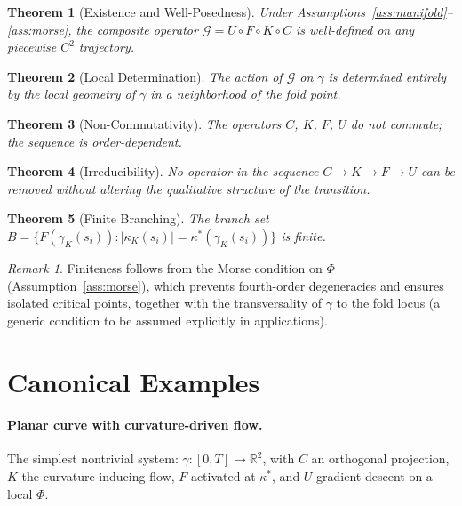 \documentclass[12pt, oneside]{book}
\theoremstyle{plain}
\newtheorem{theorem}{Theorem}[section]
\theoremstyle{definition}
\theoremstyle{remark}
\newtheorem{remark}{Remark}[section]
\begin{document}
\begin{theorem}[Existence and Well-Posedness]
Under Assumptions~\ref{ass:manifold}--\ref{ass:morse}, the composite
operator $\mathcal{G} = U \circ F \circ K \circ C$ is well-defined on
any piecewise $C^2$ trajectory.
\end{theorem}

\begin{theorem}[Local Determination]
The action of $\mathcal{G}$ on $\gamma$ is determined entirely by the
local geometry of $\gamma$ in a neighborhood of the fold point.
\end{theorem}

\begin{theorem}[Non-Commutativity]
The operators $C$, $K$, $F$, $U$ do not commute; the sequence is
order-dependent.
\end{theorem}

\begin{theorem}[Irreducibility]
No operator in the sequence $C \to K \to F \to U$ can be removed
without altering the qualitative structure of the transition.
\end{theorem}

\begin{theorem}[Finite Branching]
The branch set $B = \{F(\gamma_K(s_i)) :
|\kappa_K(s_i)| = \kappa^*(\gamma_K(s_i))\}$ is finite.
\end{theorem}

\begin{remark}
Finiteness follows from the Morse condition on $\Phi$
(Assumption~\ref{ass:morse}), which prevents fourth-order degeneracies
and ensures isolated critical points, together with the transversality
of $\gamma$ to the fold locus (a generic condition to be assumed
explicitly in applications).
\end{remark}

\section{Canonical Examples}

\paragraph{Planar curve with curvature-driven flow.}
The simplest nontrivial system: $\gamma : [0,T] \to \mathbb{R}^2$,
with $C$ an orthogonal projection, $K$ the curvature-inducing flow,
$F$ activated at $\kappa^*$, and $U$ gradient descent on a local
$\Phi$.
\end{document}
